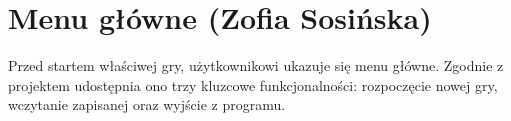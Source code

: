 \section{Menu główne (Zofia Sosińska)}\label{chap:menu_main}
Przed startem właściwej gry, użytkownikowi ukazuje się menu główne. Zgodnie z projektem udostępnia ono trzy kluzcowe funkcjonalności:
rozpoczęcie nowej gry, wczytanie zapisanej oraz wyjście z programu. 